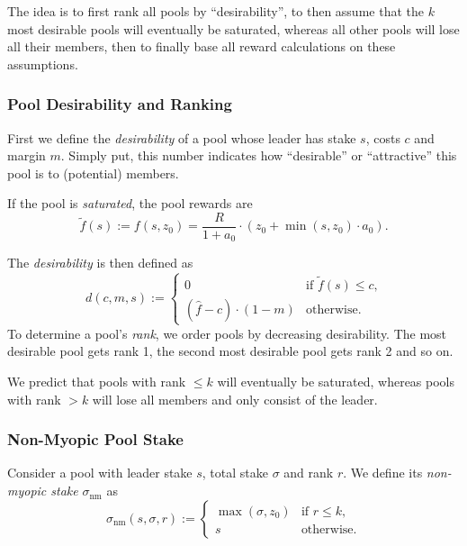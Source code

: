 \documentclass[11pt,a4paper]{article}
\begin{document}
The idea is to first rank all pools by ``desirability'', to then assume
that the \(k\) most desirable pools will eventually be saturated,
whereas all other pools will lose all their members, then to finally
base all reward calculations on these assumptions.

\subsubsection{Pool Desirability and Ranking}
\label{pool-desirability-and-ranking}

First we define the \emph{desirability} of a pool whose leader has stake
\(s\), costs \(c\) and margin \(m\). Simply put, this number indicates
how ``desirable'' or ``attractive'' this pool is to (potential) members.

If the pool is \emph{saturated}, the pool rewards are \[
    \tilde{f}(s) :=
    f(s,z_0)=
    \frac{R}{1 + a_0}
    \cdot
    \left(z_0 + \min(s,z_0)\cdot a_0\right).
\]

The \emph{desirability} is then defined as \[
    d(c, m, s) :=
    \left\{
    \begin{array}{ll}
        \displaystyle 0 &
        \text{if $\tilde{f}(s)\leq c$,} \\
        \displaystyle(\hat{f} - c)\cdot(1-m) &
        \text{otherwise.}
    \end{array}
    \right.
\] To determine a pool's \emph{rank}, we order pools by decreasing
desirability. The most desirable pool gets rank 1, the second most
desirable pool gets rank 2 and so on.

We predict that pools with rank \(\leq k\) will eventually be saturated,
whereas pools with rank \(>k\) will lose all members and only consist of
the leader.

\subsubsection{Non-Myopic Pool Stake}
\label{non-myopic-pool-stake}

Consider a pool with leader stake \(s\), total stake \(\sigma\) and rank
\(r\). We define its \emph{non-myopic stake} \(\sigma_\mathrm{nm}\) as
\[
    \sigma_\mathrm{nm}(s,\sigma,r) :=
    \left\{
    \begin{array}{ll}
        \max(\sigma,z_0) &
        \text{if $r\leq k$,} \\
        s &
        \text{otherwise.}
    \end{array}
    \right.
\]
\end{document}
